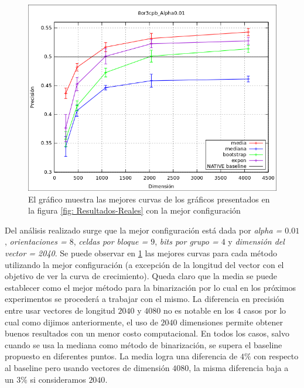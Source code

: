 			\begin{figure}[htbp]
				\centering
				\centerline{
					\includegraphics[scale=0.7]{img/resultados/reales/comparativa_metodos.png}
				}
				\caption[Reales comparativa]{El gráfico muestra las mejores curvas de los gráficos presentados en la figura \ref{fig: Resultados-Reales} con la mejor configuración}
				\label{fig: Reales-Comparativa metodos}
			\end{figure}
	
	Del análisis realizado surge que la mejor configuración está dada por \textit{alpha = $0.01$}, \textit{orientaciones = $8$}, \textit{celdas por bloque = $9$}, \textit{bits por grupo = $4$} y \textit{dimensión del vector = 2040}. Se puede observar en \ref{fig: Reales-Comparativa metodos} las mejores curvas para cada método utilizando la mejor configuración (a excepción de la longitud del vector con el objetivo de ver la curva de crecimiento). Queda claro que la media se puede establecer como el mejor método para la binarización por lo cual en los próximos experimentos se procederá a trabajar con el mismo. La diferencia en precisión entre usar vectores de longitud $2040$ y $4080$ no es notable en los $4$ casos por lo cual como dijimos anteriormente, el uso de $2040$ dimensiones permite obtener buenos resultados con un menor costo computacional. En todos los casos, salvo cuando se usa la mediana como método de binarización, se supera el baseline propuesto en diferentes puntos. La media logra una diferencia de $4\%$ con respecto al baseline pero usando vectores de dimensión $4080$, la misma diferencia baja a un $3\%$ si consideramos $2040$.
	
